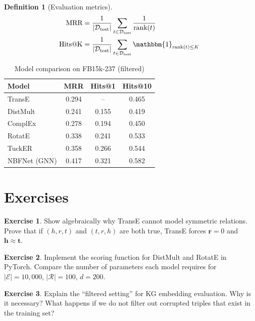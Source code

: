 \documentclass[11pt,a4paper,oneside,openany]{book}
\theoremstyle{definition}
\newtheorem{definition}{Definition}[chapter]
\newtheorem{exercise}{Exercise}[chapter]
\theoremstyle{plain}
\theoremstyle{remark}
\newcommand{\cE}{\mathcal{E}}
\newcommand{\cR}{\mathcal{R}}
\newcommand{\bone}{\mathbbm{1}}
\begin{document}
\begin{definition}[Evaluation metrics]
	\begin{align*}
		\text{MRR}    & = \frac{1}{|\mathcal{D}_{\text{test}}|} \sum_{t \in \mathcal{D}_{\text{test}}} \frac{1}{\text{rank}(t)}     \\
		\text{Hits@K} & = \frac{1}{|\mathcal{D}_{\text{test}}|} \sum_{t \in \mathcal{D}_{\text{test}}} \bone_{\text{rank}(t) \le K}
	\end{align*}
\end{definition}

\begin{table}[h]
	\centering
	\caption{Model comparison on FB15k-237 (filtered)}
	\label{tab:emb-compare}
	\begin{tabular}{lccc}
		\toprule
		Model        & MRR   & Hits@1 & Hits@10 \\
		\midrule
		TransE       & 0.294 & --     & 0.465   \\
		DistMult     & 0.241 & 0.155  & 0.419   \\
		ComplEx      & 0.278 & 0.194  & 0.450   \\
		RotatE       & 0.338 & 0.241  & 0.533   \\
		TuckER       & 0.358 & 0.266  & 0.544   \\
		NBFNet (GNN) & 0.417 & 0.321  & 0.582   \\
		\bottomrule
	\end{tabular}
\end{table}

\section{Exercises}

\begin{exercise}
	Show algebraically why TransE cannot model symmetric relations. Prove that if $(h, r, t)$ and $(t, r, h)$ are both true, TransE forces $\mathbf{r} = 0$ and $\mathbf{h} \approx \mathbf{t}$.
\end{exercise}

\begin{exercise}
	Implement the scoring function for DistMult and RotatE in PyTorch. Compare the number of parameters each model requires for $|\cE| = 10{,}000$, $|\cR| = 100$, $d = 200$.
\end{exercise}

\begin{exercise}
	Explain the ``filtered setting'' for KG embedding evaluation. Why is it necessary? What happens if we do not filter out corrupted triples that exist in the training set?
\end{exercise}
\end{document}
